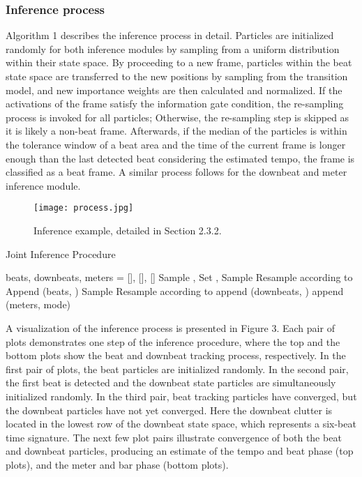 \documentclass{article}
\begin{document}
\subsubsection{Inference process}
Algorithm 1 describes the inference process in detail. Particles are initialized randomly for both inference modules by sampling from a uniform distribution within their state space. By proceeding to a new frame, particles within the beat state space are transferred to the new positions by sampling from the transition model, and new importance weights are then calculated and normalized. If the activations of the frame satisfy the information gate condition, the re-sampling process is invoked for all particles; Otherwise, the re-sampling step is skipped as it is likely a non-beat frame. Afterwards, if the median of the particles is within the tolerance window  of a beat area and the time of the current frame is longer enough than the last detected beat considering the estimated tempo, the frame is classified as a beat frame. A similar process follows for the downbeat and meter inference module. 

\begin{figure}[htbp]
 \centerline{
 \texttt{[image: process.jpg]}}
 \caption{Inference example, detailed in Section 2.3.2.}
 \label{fig2}
\end{figure}



\begin{algorithm}
    \caption{Joint Inference Procedure}
    \begin{algorithmic}
\STATE beats, downbeats, meters = [], [], []
    \vspace{1mm}
\STATE Sample , 
\STATE Set , 
    \vspace{1mm}
\FOR{}
\STATE Sample 
        \STATE 
        \STATE 
        \IF{}
            \STATE Resample  according to 
\ENDIF
        \IF{}
                \STATE Append (beats, )
                \STATE Sample 
                \STATE 
                \STATE 
                \STATE Resample  according to 
                \STATE append (downbeats, )
                \STATE append (meters, mode)
                \ENDIF
        \ENDIF
\ENDFOR
\end{algorithmic}
\end{algorithm}


A visualization of the inference process is presented in Figure 3. Each pair of plots demonstrates one step of the inference procedure, where the top and the bottom plots show the beat and downbeat tracking process, respectively. In the first pair of plots, the beat particles are initialized randomly. In the second pair, the first beat is detected and the downbeat state particles are simultaneously initialized randomly. In the third pair, beat tracking particles have converged, but the downbeat particles have not yet converged. Here the downbeat clutter is located in the lowest row of the downbeat state space, which represents a six-beat time signature. The next few plot pairs illustrate convergence of both the beat and downbeat particles, producing an estimate of the tempo and beat phase (top plots), and the meter and bar phase (bottom plots).
\end{document}
